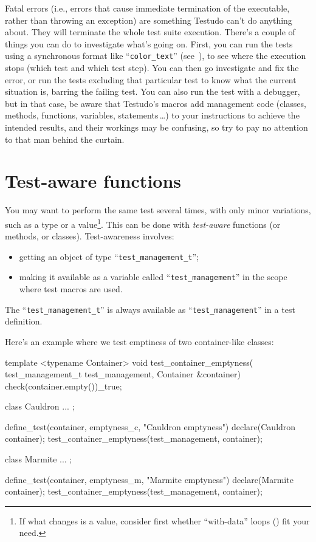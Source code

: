 \documentclass[twoside, a4paper, article]{memoir}
\newcommand*\ellipsis{\,\ldots}
\begin{document}
Fatal errors (i.e., errors that cause immediate termination of the executable,
rather than throwing an exception) are something Testudo can't do anything
about.  They will terminate the whole test suite execution.  There's a couple
of things you can do to investigate what's going on.  First, you can run the
tests using a synchronous format like ``\texttt{color\_text}''
(see~), to see where the execution stops (which
test and which test step).  You can then go investigate and fix the error, or
run the tests excluding that particular test to know what the current situation
is, barring the failing test.  You can also run the test with a debugger, but
in that case, be aware that Testudo's macros add management code (classes,
methods, functions, variables, statements\ellipsis{}) to your instructions to
achieve the intended results, and their workings may be confusing, so try to
pay no attention to that man behind the curtain.


\chapter{Test-aware functions}
\label{cha:test-aware-functions}

You may want to perform the same test several times, with only minor
variations, such as a type or a value\footnote{If what changes is a value,
  consider first whether ``with-data'' loops () fit
  your need.}.  This can be done with \emph{test-aware} functions (or methods,
or classes).  Test-awareness involves:
\begin{itemize}
\item getting an object of type ``\texttt{test\_management\_t}'';
\item making it available as a variable called ``\texttt{test\_management}'' in
  the scope where test macros are used.
\end{itemize}
The ``\texttt{test\_management\_t}'' is always available as
``\texttt{test\_management}'' in a test definition.

Here's an example where we test emptiness of two container-like classes:
\begin{cpplisting}
template <typename Container>
void test_container_emptyness(
    test_management_t test_management,
    Container &container) {
  check(container.empty())_true;
}

class Cauldron { ... };

define_test(container, emptyness_c, "Cauldron emptyness") {
  declare(Cauldron container);
  test_container_emptyness(test_management, container);
}

class Marmite { ... };

define_test(container, emptyness_m, "Marmite emptyness") {
  declare(Marmite container);
  test_container_emptyness(test_management, container);
}
\end{cpplisting}
\end{document}
